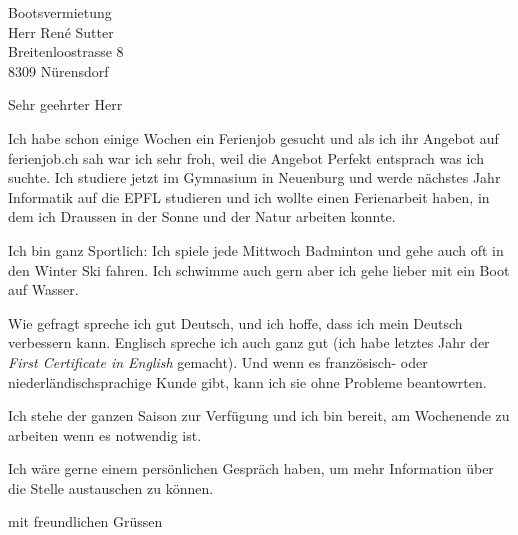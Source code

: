 \documentclass[10pt,a4paper]{letter}
\date{12. März 2018}
\begin{document}
 
\begin{letter}{Bootsvermietung \\ Herr René Sutter \\ Breitenloostrasse 8 \\ 8309 Nürensdorf} 
\opening{Sehr geehrter Herr} 
 
Ich habe schon einige Wochen ein Ferienjob gesucht und als ich ihr Angebot auf ferienjob.ch sah war ich sehr froh, weil die Angebot Perfekt entsprach was ich suchte. Ich studiere jetzt im Gymnasium in Neuenburg und werde nächstes Jahr Informatik auf die EPFL studieren und ich wollte einen Ferienarbeit haben, in dem ich Draussen in der Sonne und der Natur arbeiten konnte.


Ich bin ganz Sportlich: Ich spiele jede Mittwoch Badminton und gehe auch oft in den Winter Ski fahren. Ich schwimme auch gern aber ich gehe lieber mit ein Boot auf Wasser. 


Wie gefragt spreche ich gut Deutsch, und ich hoffe, dass ich mein Deutsch verbessern kann. Englisch spreche ich auch ganz gut (ich habe letztes Jahr der \textit{First Certificate in English} gemacht). Und wenn es französisch- oder niederländischsprachige Kunde gibt, kann ich sie ohne Probleme beantowrten.


Ich stehe der ganzen Saison zur Verfügung und ich bin bereit, am Wochenende zu arbeiten wenn es notwendig ist.


Ich wäre gerne einem persönlichen Gespräch haben, um mehr Information über die Stelle austauschen zu können.

 
\closing{mit freundlichen Grüssen} 
\end{letter} 
\end{document}
